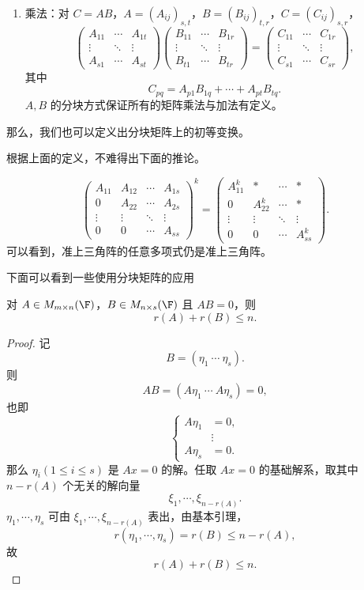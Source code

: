 \begin{definition}
\begin{enumerate}
		\item 乘法：对 $C=AB$，$A=(A_{ij})_{s,t}$，$B=(B_{ij})_{t,r}$，$C=(C_{ij})_{s,r}$，
		\[
		\begin{pmatrix}
			A_{11}&\cdots&A_{1t}\\
			\vdots&\ddots&\vdots\\
			A_{s1}&\cdots&A_{st}
		\end{pmatrix}
		\begin{pmatrix}
			B_{11}&\cdots&B_{1r}\\
			\vdots&\ddots&\vdots\\
			B_{t1}&\cdots&B_{tr}
		\end{pmatrix}
		=
		\begin{pmatrix}
			C_{11}&\cdots&C_{1r}\\
			\vdots&\ddots&\vdots\\
			C_{s1}&\cdots&C_{sr}
		\end{pmatrix},
		\]
		其中
		\[
		C_{pq}=A_{p1}B_{1q}+\cdots+A_{pt}B_{tq}.
		\]
		$A,B$ 的分块方式保证所有的矩阵乘法与加法有定义。
	\end{enumerate}
\end{definition}

那么，我们也可以定义出分块矩阵上的初等变换。

根据上面的定义，不难得出下面的推论。

\begin{corollary}\label{3.5.4}
	\[
	\begin{pmatrix}
		A_{11}&A_{12}&\cdots&A_{1s}\\
		0&A_{22}&\cdots&A_{2s}\\
		\vdots&\vdots&\ddots&\vdots\\
		0&0&\cdots&A_{ss}
	\end{pmatrix}^{k}
	=
	\begin{pmatrix}
		A_{11}^{k}&*&\cdots&*\\
		0&A_{22}^{k}&\cdots&*\\
		\vdots&\vdots&\ddots&\vdots\\
		0&0&\cdots&A_{ss}^{k}
	\end{pmatrix}.
	\]
	可以看到，准上三角阵的任意多项式仍是准上三角阵。
\end{corollary}
下面可以看到一些使用分块矩阵的应用
\begin{proposition}\label{3.5.5}
	对 $A\in M_{m\times n}(\F)$，$B\in M_{n\times s}(\F)$ 且 $AB=0$，则
	\[
	r(A)+r(B)\leq n.
	\]
\end{proposition}

\begin{proof}
	记
	\[
	B=(\eta_1\ \cdots\ \eta_s).
	\]
	则
	\[
	AB=(A\eta_1\ \cdots\ A\eta_s)=0,
	\]
	也即
	\[
	\left\{
	\begin{aligned}
		A\eta_1&=0,\\
		&\vdots\\
		A\eta_s&=0.
	\end{aligned}
	\right.
	\]
	那么 $\eta_i(1\leq i\leq s)$ 是 $Ax=0$ 的解。任取 $Ax=0$ 的基础解系，取其中 $n-r(A)$ 个无关的解向量
	\[
	\xi_1,\cdots,\xi_{n-r(A)}.
	\]
	$\eta_1,\cdots,\eta_s$ 可由 $\xi_1,\cdots,\xi_{n-r(A)}$ 表出，由基本引理，
	\[
	r(\eta_1,\cdots,\eta_s)=r(B)\leq n-r(A),
	\]
	故
	\[
	r(A)+r(B)\leq n.
	\]
\end{proof}

